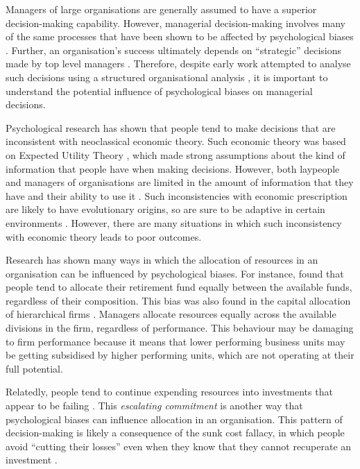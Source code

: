 \documentclass[a4paper, nobind, dvipsnames]{templates/ociamthesis}
\theoremstyle{definition}
\theoremstyle{definition}
\theoremstyle{definition}
\theoremstyle{definition}
\theoremstyle{remark}
\begin{document}
Managers of large organisations are generally assumed to have a superior
decision-making capability. However, managerial decision-making involves many of
the same processes that have been shown to be affected by psychological biases
\autocite{schwenk1984,das1999,mccray2002}. Further, an organisation's success
ultimately depends on ``strategic'' decisions made by top level managers
\autocite{mazzolini1981}. Therefore, despite early work attempted to analyse such
decisions using a structured organisational analysis \autocite[e.g.,][]{mintzberg1976}, it
is important to understand the potential influence of psychological biases on
managerial decisions.

Psychological research has shown that people tend to make decisions that are
inconsistent with neoclassical economic theory. Such economic theory was based
on Expected Utility Theory \autocites[EUT;][]{friedman1948,vonneumann1944}, which made
strong assumptions about the kind of information that people have when making
decisions. However, both laypeople and managers of organisations are limited in
the amount of information that they have and their ability to use it
\autocite{simon1955,cyert1956}. Such inconsistencies with economic prescription are
likely to have evolutionary origins, so are sure to be adaptive in certain
environments \autocite{haselton2009,gigerenzer2008}. However, there are many
situations in which such inconsistency with economic theory leads to poor
outcomes.

Research has shown many ways in which the allocation of resources in an
organisation can be influenced by psychological biases. For instance,
\textcite{benartzi2001} found that people tend to allocate their retirement fund equally
between the available funds, regardless of their composition. This bias was also
found in the capital allocation of hierarchical firms \autocite{bardolet2011}. Managers
allocate resources equally across the available divisions in the firm,
regardless of performance. This behaviour may be damaging to firm performance
because it means that lower performing business units may be getting subsidised
by higher performing units, which are not operating at their full potential.

Relatedly, people tend to continue expending resources into investments that
appear to be failing \autocite{staw1981}. This \emph{escalating commitment} is another way
that psychological biases can influence allocation in an organisation. This
pattern of decision-making is likely a consequence of the sunk cost fallacy, in
which people avoid ``cutting their losses'' even when they know that they cannot
recuperate an investment \autocite{parayre1995}.
\end{document}
